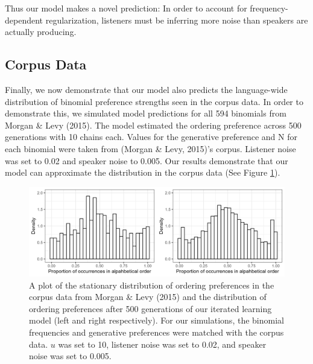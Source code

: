 \documentclass[10pt, letterpaper]{article}
\newenvironment{CodeChunk}{}{}
\begin{document}
Thus our model makes a novel prediction: In order to account for
frequency-dependent regularization, listeners must be inferring more
noise than speakers are actually producing.

\hypertarget{corpus-data}{%
\subsection{Corpus Data}\label{corpus-data}}

Finally, we now demonstrate that our model also predicts the
language-wide distribution of binomial preference strengths seen in the
corpus data. In order to demonstrate this, we simulated model
predictions for all 594 binomials from Morgan \& Levy (2015). The model
estimated the ordering preference across 500 generations with 10 chains
each. Values for the generative preference and N for each binomial were
taken from (Morgan \& Levy, 2015)'s corpus. Listener noise was set to
0.02 and speaker noise to 0.005. Our results demonstrate that our model
can approximate the distribution in the corpus data (See Figure
\ref{fig:corpusourmodel}).

\begin{CodeChunk}
\begin{figure}[tb]

{\centering \includegraphics[width=1\linewidth]{Figures/corpus_plot_and_ours} 

}

\caption[A plot of the stationary distribution of ordering preferences in the corpus data from Morgan \& Levy (2015) and the distribution of ordering preferences after 500 generations of our iterated learning model (left and right respectively)]{A plot of the stationary distribution of ordering preferences in the corpus data from Morgan \& Levy (2015) and the distribution of ordering preferences after 500 generations of our iterated learning model (left and right respectively). For our simulations, the binomial frequencies and generative preferences were matched with the corpus data. $
u$ was set to 10, listener noise was set to 0.02, and speaker noise was set to 0.005.}\label{fig:corpusourmodel}
\end{figure}
\end{CodeChunk}
\end{document}
